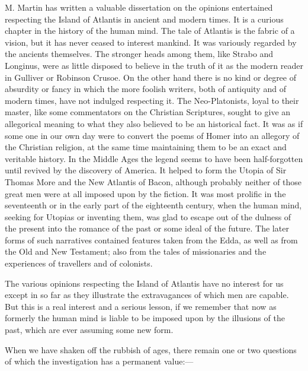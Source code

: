 M. Martin has written a valuable dissertation on the opinions entertained
respecting the Island of Atlantis in ancient and modern times. It is a
curious chapter in the history of the human mind. The tale of Atlantis is
the fabric of a vision, but it has never ceased to interest mankind. It
was variously regarded by the ancients themselves. The stronger heads
among them, like Strabo and Longinus, were as little disposed to believe
in the truth of it as the modern reader in Gulliver or Robinson Crusoe. On
the other hand there is no kind or degree of absurdity or fancy in which
the more foolish writers, both of antiquity and of modern times, have not
indulged respecting it. The Neo-Platonists, loyal to their master, like
some commentators on the Christian Scriptures, sought to give an
allegorical meaning to what they also believed to be an historical fact.
It was as if some one in our own day were to convert the poems of Homer
into an allegory of the Christian religion, at the same time maintaining
them to be an exact and veritable history. In the Middle Ages the legend
seems to have been half-forgotten until revived by the discovery of
America. It helped to form the Utopia of Sir Thomas More and the New
Atlantis of Bacon, although probably neither of those great men were at
all imposed upon by the fiction. It was most prolific in the seventeenth
or in the early part of the eighteenth century, when the human mind,
seeking for Utopias or inventing them, was glad to escape out of the
dulness of the present into the romance of the past or some ideal of the
future. The later forms of such narratives contained features taken from
the Edda, as well as from the Old and New Testament; also from the tales
of missionaries and the experiences of travellers and of colonists.

The various opinions respecting the Island of Atlantis have no interest
for us except in so far as they illustrate the extravagances of which men
are capable. But this is a real interest and a serious lesson, if we
remember that now as formerly the human mind is liable to be imposed upon
by the illusions of the past, which are ever assuming some new form.

When we have shaken off the rubbish of ages, there remain one or two
questions of which the investigation has a permanent value:—

